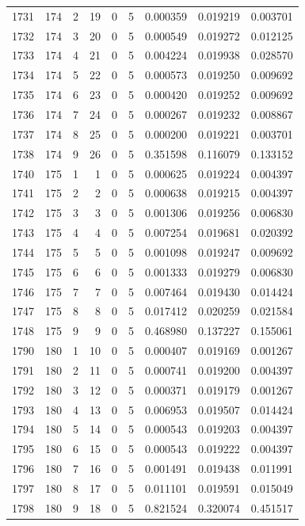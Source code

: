 \begin{longtable}{rrrrrrrrr}
1731 & 174 & 2 & 19 & 0 & 5 & 0.000359 & 0.019219 & 0.003701 \\
1732 & 174 & 3 & 20 & 0 & 5 & 0.000549 & 0.019272 & 0.012125 \\
1733 & 174 & 4 & 21 & 0 & 5 & 0.004224 & 0.019938 & 0.028570 \\
1734 & 174 & 5 & 22 & 0 & 5 & 0.000573 & 0.019250 & 0.009692 \\
1735 & 174 & 6 & 23 & 0 & 5 & 0.000420 & 0.019252 & 0.009692 \\
1736 & 174 & 7 & 24 & 0 & 5 & 0.000267 & 0.019232 & 0.008867 \\
1737 & 174 & 8 & 25 & 0 & 5 & 0.000200 & 0.019221 & 0.003701 \\
1738 & 174 & 9 & 26 & 0 & 5 & 0.351598 & 0.116079 & 0.133152 \\
1740 & 175 & 1 & 1 & 0 & 5 & 0.000625 & 0.019224 & 0.004397 \\
1741 & 175 & 2 & 2 & 0 & 5 & 0.000638 & 0.019215 & 0.004397 \\
1742 & 175 & 3 & 3 & 0 & 5 & 0.001306 & 0.019256 & 0.006830 \\
1743 & 175 & 4 & 4 & 0 & 5 & 0.007254 & 0.019681 & 0.020392 \\
1744 & 175 & 5 & 5 & 0 & 5 & 0.001098 & 0.019247 & 0.009692 \\
1745 & 175 & 6 & 6 & 0 & 5 & 0.001333 & 0.019279 & 0.006830 \\
1746 & 175 & 7 & 7 & 0 & 5 & 0.007464 & 0.019430 & 0.014424 \\
1747 & 175 & 8 & 8 & 0 & 5 & 0.017412 & 0.020259 & 0.021584 \\
1748 & 175 & 9 & 9 & 0 & 5 & 0.468980 & 0.137227 & 0.155061 \\
1790 & 180 & 1 & 10 & 0 & 5 & 0.000407 & 0.019169 & 0.001267 \\
1791 & 180 & 2 & 11 & 0 & 5 & 0.000741 & 0.019200 & 0.004397 \\
1792 & 180 & 3 & 12 & 0 & 5 & 0.000371 & 0.019179 & 0.001267 \\
1793 & 180 & 4 & 13 & 0 & 5 & 0.006953 & 0.019507 & 0.014424 \\
1794 & 180 & 5 & 14 & 0 & 5 & 0.000543 & 0.019203 & 0.004397 \\
1795 & 180 & 6 & 15 & 0 & 5 & 0.000543 & 0.019222 & 0.004397 \\
1796 & 180 & 7 & 16 & 0 & 5 & 0.001491 & 0.019438 & 0.011991 \\
1797 & 180 & 8 & 17 & 0 & 5 & 0.011101 & 0.019591 & 0.015049 \\
1798 & 180 & 9 & 18 & 0 & 5 & 0.821524 & 0.320074 & 0.451517 \\

\end{longtable}
